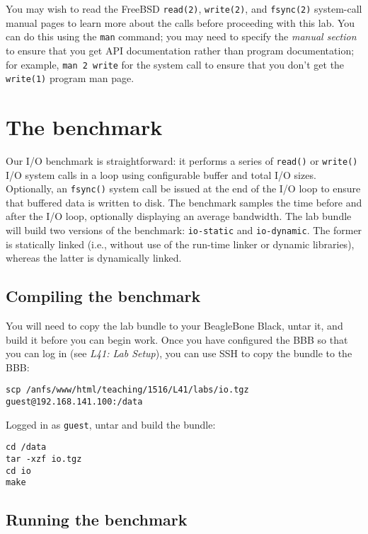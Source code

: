 \documentclass[a4paper,10pt]{article}
\begin{document}
You may wish to read the FreeBSD \texttt{read(2)}, \texttt{write(2)}, and
\texttt{fsync(2)} system-call manual pages to learn more about the calls
before proceeding with this lab.
You can do this using the \texttt{man} command; you may need to specify the
\textit{manual section} to ensure that you get API documentation rather than
program documentation; for example, \texttt{man 2 write} for the system call
to ensure that you don't get the \texttt{write(1)} program man page.

\section*{The benchmark}

Our I/O benchmark is straightforward: it performs a series of \texttt{read()}
or \texttt{write()} I/O system calls in a loop using configurable buffer and
total I/O sizes.
Optionally, an \texttt{fsync()} system call be issued at the end of the I/O
loop to ensure that buffered data is written to disk.
The benchmark samples the time before and after the I/O loop, optionally
displaying an average bandwidth.
The lab bundle will build two versions of the benchmark: \texttt{io-static}
and \texttt{io-dynamic}.
The former is statically linked (i.e., without use of the run-time linker or
dynamic libraries), whereas the latter is dynamically linked.

\subsection*{Compiling the benchmark}

You will need to copy the lab bundle to your BeagleBone Black, untar it, and
build it before you can begin work.
Once you have configured the BBB so that you can log in (see \textit{L41: Lab
Setup}), you can use SSH to copy the bundle to the BBB:

\begin{verbatim}
scp /anfs/www/html/teaching/1516/L41/labs/io.tgz guest@192.168.141.100:/data
\end{verbatim}

\noindent
Logged in as \texttt{guest}, untar and build the bundle:

\begin{verbatim}
cd /data
tar -xzf io.tgz
cd io
make
\end{verbatim}

\subsection*{Running the benchmark}
\end{document}
